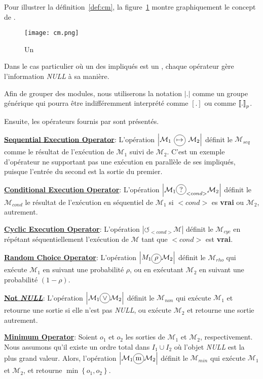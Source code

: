 Pour illustrer la définition~\ref{def:cm}, la figure~\ref{fig:cm} montre graphiquement le concept de \cm.
\begin{figure}
	\centering
	\texttt{[image: cm.png]} %
	\caption[]{Un \cm}
	\label{fig:cm}
\end{figure}%

Dans le  cas particulier  où un  des \cms{}  impliqués est  un \opch{}, chaque opérateur gère l'information {\it NULL} à sa manière.

Afin   de  grouper   des   modules,  nous   utiliserons  la   notation $\left|.\right|$ comme un groupe générique qui pourra être indifféremment interprété comme $[.]$ ou comme $\left\llbracket . \right\rrbracket_p$.

Ensuite, les opérateurs fournis par \posl{} sont présentés. 

\underline{\bf Sequential Execution Operator}: L'opération $\left|\mathcal{M}_1\poslop{\mapsto}\mathcal{M}_2\right|$ définit le \cm{} $\mathcal{M}_{seq}$ comme le résultat de l'exécution de $\mathcal{M}_1$ suivi de $\mathcal{M}_2$. C'est un exemple d'opérateur ne  supportant pas une exécution en parallèle de ses \cms{} impliqués, puisque l'entrée du second \cm{} est la sortie du premier.

\underline{\bf Conditional Execution Operator}: L'opération $\left|\mathcal{M}_1\circled{?}_{<cond>}\mathcal{M}_2\right|$ définit le \cm{} $\mathcal{M}_{cond}$ le résultat de l'exécution en séquentiel de $\mathcal{M}_1$ si $<cond>$ es {\bf vrai} ou $\mathcal{M}_2$, autrement.

\underline{\bf Cyclic Execution Operator}: L'opération $\left|\circlearrowleft_{<cond>}\mathcal{M}\right|$ définit le \cm{} $\mathcal{M}_{cyc}$ en répétant séquentiellement l'exécution de $\mathcal{M}$ tant que $<cond>$ est {\bf vrai}.

\underline{\bf Random Choice Operator}: L'opération $\left|M_1\circled{$\rho$}\mathcal{M}_2\right|$ définit le \cm{} $\mathcal{M}_{rho}$ qui exécute $\mathcal{M}_1$ en suivant une probabilité $\rho$, ou en exécutant $\mathcal{M}_2$ en suivant une probabilité $(1-\rho)$.

\underline{\bf Not {\it NULL}}: L'opération $\left|\mathcal{M}_1\circled{$\vee$}\mathcal{M}_2\right|$ définit le \cm{} $\mathcal{M}_{non}$ qui exécute $\mathcal{M}_1$ et retourne une sortie si elle n'est pas {\it NULL}, ou exécute $\mathcal{M}_2$ et retourne une sortie autrement.

\underline{\bf Minimum Operator}: Soient $o_1$ et $o_2$ les sorties de $\mathcal{M}_1$ et $\mathcal{M}_2$, respectivement. Nous assumons qu'il existe un ordre total dans $I_1 \cup I_2$ où l'objet \emph{NULL} est la plus grand valeur. Alors, l'opération $\left|\mathcal{M}_1\circled{m}\mathcal{M}_2\right|$ définit le \cm{} $\mathcal{M}_{min}$ qui exécute $\mathcal{M}_1$ et $\mathcal{M}_2$, et retourne $\min\left\{o_1,o_2\right\}$.

